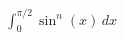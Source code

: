\documentclass[preview]{standalone}
\begin{document}
\begin{align*}
\int_0^{\pi/2} \sin^n(x) \, dx
\end{align*}
\end{document}
